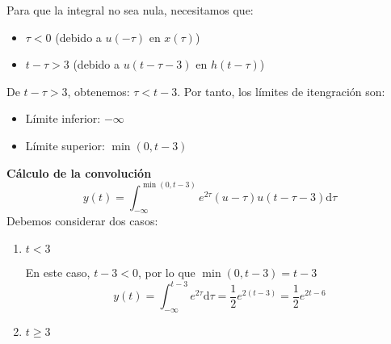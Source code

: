 \begin{enumerate}[label=\color{red}\textbf{\arabic*)}]
    Para que la integral no sea nula, necesitamos que:
    \begin{itemize}[label=\textbullet]
      \item $\tau<0$ (debido a $u(-\tau)$ en  $x(\tau)$) 
      \item $t-\tau>3$ (debido a $u(t-\tau-3)$ en  $h(t-\tau)$)
    \end{itemize}
    De $t-\tau>3$, obtenemos:  $\tau<t-3$. Por tanto, los límites de itengración son:
     \begin{itemize}[label=\textbullet]
      \item Límite inferior: $-\infty$
      \item Límite superior: $\min(0,t-3)$
    \end{itemize}
    \textbf{Cálculo de la convolución}
    \[
    y(t)=\int_{-\infty}^{\min(0,t-3)} e^{2\tau}(u-\tau)u(t-\tau-3)\mathrm{d}\tau 
    \] 
    Debemos considerar dos casos:
    \begin{enumerate}[label=Caso \arabic*:]
      \item $t<3$

        En este caso,  $t-3<0$, por lo que  $\min(0,t-3)=t-3$
         \[
        y(t)=\int_{-\infty}^{t-3} e^{2\tau}\mathrm{d}\tau=\dfrac{1}{2}e^{2(t-3)}=\dfrac{1}{2}e^{2t-6}    
        \] 
      \item $t\ge 3$


\end{enumerate}
\end{enumerate}
